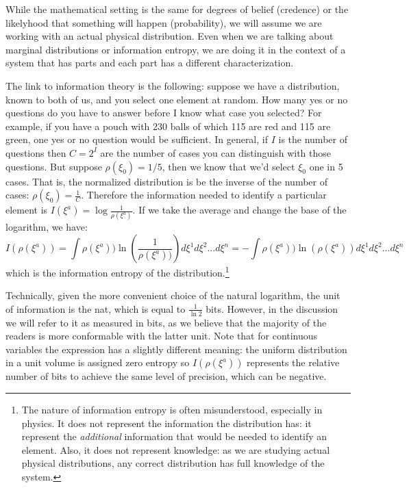 \documentclass[11pt]{article}
\begin{document}
While the mathematical setting is the same for degrees of belief (credence) or the likelyhood that something will happen (probability), we will assume we are working with an actual physical distribution. Even when we are talking about marginal distributions or information entropy, we are doing it in the context of a system that has parts and each part has a different characterization.

The link to information theory is the following: suppose we have a distribution, known to both of us, and you select one element at random. How many yes or no questions do you have to answer before I know what case you selected? For example, if you have a pouch with 230 balls of which 115 are red and 115 are green, one yes or no question would be sufficient. In general, if $I$ is the number of questions then $C = 2 ^ I$ are the number of cases you can distinguish with those questions. But suppose $\rho(\xi_0)=1/5$, then we know that we'd select $\xi_0$ one in 5 cases. That is, the normalized distribution is be the inverse of the number of cases: $\rho(\xi_0) = \frac{1}{C}$.  Therefore the information needed to identify a particular element is $I(\xi^a)=\log \frac{1}{\rho(\xi^a)}$. If we take the average and change the base of the logarithm, we have:
\begin{equation}
I(\rho(\xi^a)) = \int \rho(\xi^a)) \ln \left(\frac{1}{\rho(\xi^a))}\right) d\xi^1 d\xi^2 ... d\xi^n =-\int \rho(\xi^a)) \ln (\rho(\xi^a)) d\xi^1 d\xi^2 ... d\xi^n
\end{equation}
which is the information entropy of the distribution.\footnote{The nature of information entropy is often misunderstood, especially in physics. It does not represent the information the distribution has: it represent the \emph{additional} information that would be needed to identify an element. Also, it does not represent knowledge: as we are studying actual physical distributions, any correct distribution has full knowledge of the system.}

Technically, given the more convenient choice of the natural logarithm, the unit of information is the nat, which is equal to $\frac{1}{\ln 2}$ bits. However, in the discussion we will refer to it as measured in bits, as we believe that the majority of the readers is more conformable with the latter unit. Note that for continuous variables the expression has a slightly different meaning: the uniform distribution in a unit volume is assigned zero entropy so $I(\rho(\xi^a))$ represents the relative number of bits to achieve the same level of precision, which can be negative.
\end{document}
